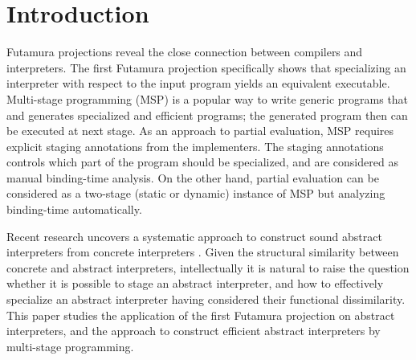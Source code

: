 \section{Introduction}


Futamura projections \cite{Futamura1999, futamura1971partial} reveal the close connection between 
compilers and interpreters. 
The first Futamura projection specifically shows that specializing an interpreter with respect to the input program yields 
an equivalent executable.
Multi-stage programming (MSP) \cite{taha1999multi, DBLP:conf/pepm/TahaS97} is a popular way to write 
generic programs that and generates specialized and efficient programs;  
the generated program then can be executed at next stage. 
As an approach to partial evaluation, MSP requires explicit staging annotations from the implementers.
The staging annotations controls which part of the program should be specialized, and are considered 
as manual binding-time analysis. On the other hand, partial evaluation \cite{DBLP:books/daglib/0072559} 
can be considered as a two-stage (static or dynamic) instance of MSP but analyzing binding-time automatically. 

Recent research  uncovers a systematic approach to construct sound abstract interpreters 
from concrete interpreters \cite{DBLP:journals/jfp/HornM12, DBLP:conf/icfp/HornM10, DBLP:journals/pacmpl/DaraisLNH17}.
Given the structural similarity between concrete and abstract interpreters, intellectually 
it is natural to raise the question whether it is possible to stage an abstract interpreter, and how 
to effectively specialize an abstract interpreter having considered their functional dissimilarity. 
This paper studies the application of the first Futamura projection on abstract interpreters, 
and the approach to construct efficient abstract interpreters by multi-stage programming.

